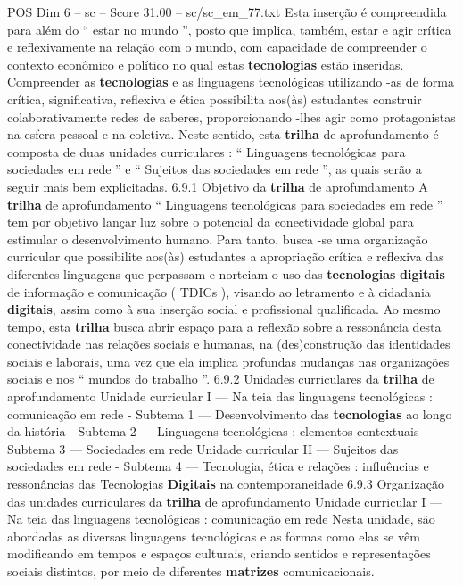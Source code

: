 \begin{textsample}{POS Dim 6 – sc – Score 31.00 – sc/sc\_em\_77.txt}
Esta inserção é compreendida para além do “ estar no mundo ”, posto que implica, também, estar e agir crítica e reflexivamente na relação com o mundo, com capacidade de compreender o contexto econômico e político no qual estas \textbf{tecnologias} estão inseridas.
Compreender as \textbf{tecnologias} e as linguagens tecnológicas utilizando -as de forma crítica, significativa, reflexiva e ética possibilita aos(às) estudantes construir colaborativamente redes de saberes, proporcionando -lhes agir como protagonistas na esfera pessoal e na coletiva.
Neste sentido, esta \textbf{trilha} de aprofundamento é composta de duas unidades curriculares : “ Linguagens tecnológicas para sociedades em rede ” e “ Sujeitos das sociedades em rede ”, as quais serão a seguir mais bem explicitadas. 6.9.1 Objetivo da \textbf{trilha} de aprofundamento A \textbf{trilha} de aprofundamento “ Linguagens tecnológicas para sociedades em rede ” tem por objetivo lançar luz sobre o potencial da conectividade global para estimular o desenvolvimento humano.
Para tanto, busca -se uma organização curricular que possibilite aos(às) estudantes a apropriação crítica e reflexiva das diferentes linguagens que perpassam e norteiam o uso das \textbf{tecnologias} \textbf{digitais} de informação e comunicação ( TDICs ), visando ao letramento e à cidadania \textbf{digitais}, assim como à sua inserção social e profissional qualificada.
Ao mesmo tempo, esta \textbf{trilha} busca abrir espaço para a reflexão sobre a ressonância desta conectividade nas relações sociais e humanas, na (des)construção das identidades sociais e laborais, uma vez que ela implica profundas mudanças nas organizações sociais e nos “ mundos do trabalho ”. 6.9.2 Unidades curriculares da \textbf{trilha} de aprofundamento Unidade curricular I — Na teia das linguagens tecnológicas : comunicação em rede - Subtema 1 — Desenvolvimento das \textbf{tecnologias} ao longo da história - Subtema 2 — Linguagens tecnológicas : elementos contextuais - Subtema 3 — Sociedades em rede Unidade curricular II — Sujeitos das sociedades em rede - Subtema 4 — Tecnologia, ética e relações : influências e ressonâncias das Tecnologias \textbf{Digitais} na contemporaneidade 6.9.3 Organização das unidades curriculares da \textbf{trilha} de aprofundamento Unidade curricular I — Na teia das linguagens tecnológicas : comunicação em rede Nesta unidade, são abordadas as diversas linguagens tecnológicas e as formas como elas se vêm modificando em tempos e espaços culturais, criando sentidos e representações sociais distintos, por meio de diferentes \textbf{matrizes} comunicacionais.

\end{textsample}
